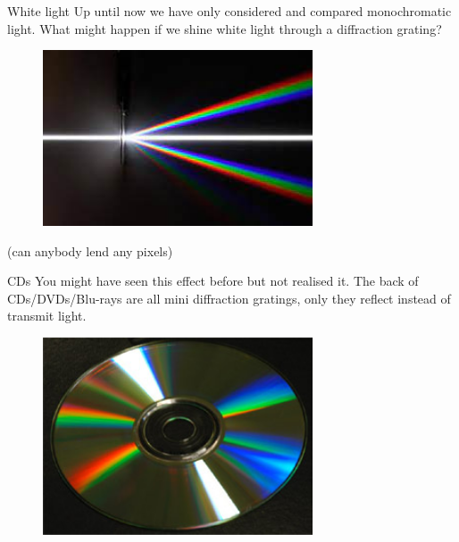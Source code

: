 \documentclass[../Main.tex]{subfiles}
\begin{document}
\begin{frame}{White light}
    Up until now we have only considered and compared monochromatic light. What might happen if we shine white light through a diffraction grating? 
    \begin{figure}
        \centering
        \includegraphics[width=8cm]{Waves_Images/whitelightgrating.jpeg}
    \end{figure}
    {\tiny (can anybody lend any pixels)}
\end{frame}

\begin{frame}{CDs}
    You might have seen this effect before but not realised it. The back of CDs/DVDs/Blu-rays are all mini diffraction gratings, only they reflect instead of transmit light.
    
    \begin{figure}
        \centering
        \includegraphics[width=8cm]{Waves_Images/cddiffract.jpg}
    \end{figure}
\end{frame}
\end{document}
